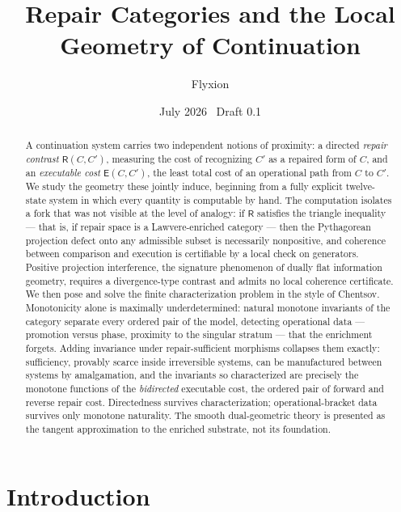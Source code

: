 \documentclass[11pt]{article}
\title{Repair Categories and the Local Geometry of Continuation}
\author{Flyxion}
\date{July 2026 \textperiodcentered\ Draft 0.1}
\theoremstyle{remark}
\newcommand{\R}{\mathsf{R}}
\newcommand{\E}{\mathsf{E}}
\begin{document}
\maketitle

\begin{abstract}
A continuation system carries two independent notions of proximity: a
directed \emph{repair contrast} $\R(C,C')$, measuring the cost of
recognizing $C'$ as a repaired form of $C$, and an \emph{executable
cost} $\E(C,C')$, the least total cost of an operational path from $C$
to $C'$. We study the geometry these jointly induce, beginning from a
fully explicit twelve-state system in which every quantity is
computable by hand. The computation isolates a fork that was not
visible at the level of analogy: if $\R$ satisfies the triangle
inequality --- that is, if repair space is a Lawvere-enriched category
--- then the Pythagorean projection defect onto any admissible subset
is necessarily nonpositive, and coherence between comparison and
execution is certifiable by a local check on generators. Positive
projection interference, the signature phenomenon of dually flat
information geometry, requires a divergence-type contrast and admits
no local coherence certificate. We then pose and solve the finite
characterization problem in the style of Chentsov. Monotonicity alone
is maximally underdetermined: natural monotone invariants of the
category separate every ordered pair of the model, detecting
operational data --- promotion versus phase, proximity to the
singular stratum --- that the enrichment forgets. Adding invariance
under repair-sufficient morphisms collapses them exactly:
sufficiency, provably scarce inside irreversible systems, can be
manufactured between systems by amalgamation, and the invariants so
characterized are precisely the monotone functions of the
\emph{bidirected} executable cost, the ordered pair of forward and
reverse repair cost. Directedness survives characterization;
operational-bracket data survives only monotone naturality. The
smooth dual-geometric theory is presented as the tangent
approximation to the enriched substrate, not its foundation.
\end{abstract}

\section*{Introduction}
\end{document}
